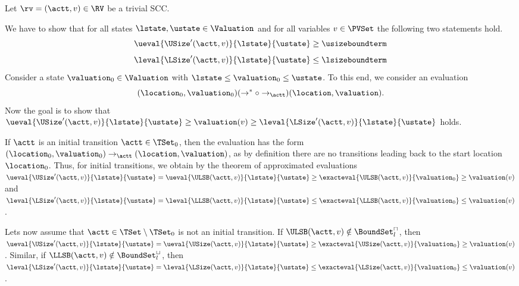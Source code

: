 Let $\rv = (\actt, v) \in \RV$ be a trivial SCC.

We have to show that for all states $\lstate, \ustate \in \Valuation$ and for all variables $v \in \PVSet$ the following two statements hold.
\[ \ueval{\USize'(\actt, v)}{\lstate}{\ustate} \geq \usizeboundterm \]
\[ \leval{\LSize'(\actt, v)}{\lstate}{\ustate} \leq \lsizeboundterm \]
Consider a state $\valuation_0 \in \Valuation$ with $\lstate \leq \valuation_0 \leq \ustate$.
To this end, we consider an evaluation
\[ (\location_0, \valuation_0) (\rightarrow^* \circ \rightarrow_\actt) (\location, \valuation). \]
Now the goal is to show that $\ueval{\USize'(\actt, v)}{\lstate}{\ustate} \geq \valuation(v) \geq \leval{\LSize'(\actt, v)}{\lstate}{\ustate}$ holds.

If $\actt$ is an initial transition $\actt \in \TSet_0$, then the evaluation has the form $(\location_0, \valuation_0) \rightarrow_\actt (\location, \valuation)$, as by definition there are no transitions leading back to the start location $\location_0$.
Thus, for initial transitions, we obtain by the theorem of approximated evaluations $\ueval{\USize'(\actt, v)}{\lstate}{\ustate} = \ueval{\ULSB(\actt, v)}{\lstate}{\ustate} \geq \exacteval{\ULSB(\actt, v)}{\valuation_0} \geq \valuation(v)$ and $\leval{\LSize'(\actt, v)}{\lstate}{\ustate} = \leval{\LLSB(\actt, v)}{\lstate}{\ustate} \leq \exacteval{\LLSB(\actt, v)}{\valuation_0} \leq \valuation(v)$.

Lets now assume that $\actt \in \TSet \setminus \TSet_0$ is not an initial transition.
If $\ULSB(\actt,v) \notin \BoundSet^\sqcap_l$, then $\ueval{\USize'(\actt, v)}{\lstate}{\ustate} = \ueval{\USize(\actt, v)}{\lstate}{\ustate} \geq \exacteval{\USize(\actt, v)}{\valuation_0} \geq \valuation(v)$.
Similar, if $\LLSB(\actt,v) \notin \BoundSet^\sqcup_l$, then $\leval{\LSize'(\actt, v)}{\lstate}{\ustate} = \leval{\LSize(\actt, v)}{\lstate}{\ustate} \leq \exacteval{\LSize(\actt, v)}{\valuation_0} \leq \valuation(v)$.


